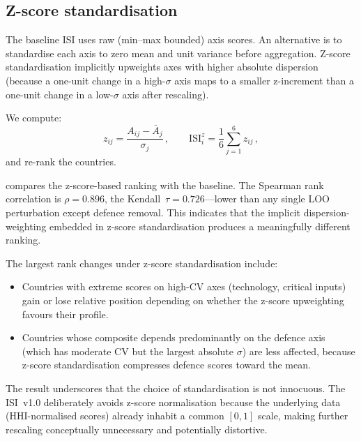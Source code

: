 \subsection{Z-score standardisation}\label{sec:zscore}

The baseline ISI uses raw (min--max bounded) axis scores.  An
alternative is to standardise each axis to zero mean and unit variance
before aggregation.  Z-score standardisation implicitly upweights
axes with higher absolute dispersion (because a one-unit change in
a high-$\sigma$ axis maps to a smaller z-increment than a one-unit
change in a low-$\sigma$ axis after rescaling).

We compute:
\begin{equation}\label{eq:zscore}
  z_{ij} = \frac{A_{ij} - \bar{A}_j}{\sigma_j}\,,
  \qquad
  \text{ISI}^{z}_i = \frac{1}{6}\sum_{j=1}^{6} z_{ij}\,,
\end{equation}
and re-rank the countries.



 compares the z-score-based ranking with the
baseline.  The Spearman rank correlation is $\rho = 0.896$, the
Kendall~$\tau = 0.726$---lower than any single LOO perturbation except
defence removal.  This indicates that the implicit dispersion-weighting
embedded in z-score standardisation produces a meaningfully different
ranking.

The largest rank changes under z-score standardisation include:
\begin{itemize}[leftmargin=2em]
  \item Countries with extreme scores on high-CV axes (technology,
    critical inputs) gain or lose relative position depending on
    whether the z-score upweighting favours their profile.
  \item Countries whose composite depends predominantly on the
    defence axis (which has moderate CV but the largest absolute
    $\sigma$) are less affected, because z-score standardisation
    compresses defence scores toward the mean.
\end{itemize}

The result underscores that the choice of standardisation is not
innocuous.  The ISI~v1.0 deliberately avoids z-score normalisation
because the underlying data (HHI-normalised scores) already inhabit
a common $[0, 1]$ scale, making further rescaling conceptually
unnecessary and potentially distortive.

